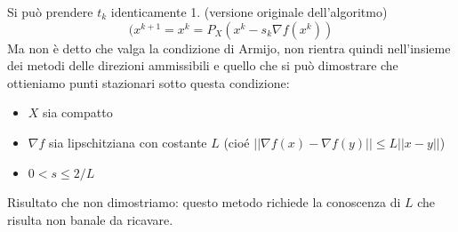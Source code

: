 Si pu\`o prendere $t_k$ identicamente 1. (versione originale dell'algoritmo)
$$(x^{k+1} = x^{k} = P_{X}(x^{k} - s_{k}\nabla f(x^{k}))$$
Ma non \`e detto che valga la condizione di Armijo,
non rientra quindi nell'insieme dei metodi delle direzioni
ammissibili e quello che si pu\`o dimostrare
che ottieniamo punti stazionari sotto questa condizione:

\begin{itemize}
\item $X$ sia compatto
\item $\nabla f$ sia lipschitziana con costante $L$ (cio\'e $|| \nabla f(x)  - \nabla f(y)|| \leq L ||x -y ||$)
\item $ 0 < s \leq 2/L$
\end{itemize}
Risultato che non dimostriamo: questo metodo richiede la conoscenza
di $L$ che risulta non banale da ricavare.

\outbpdocument
